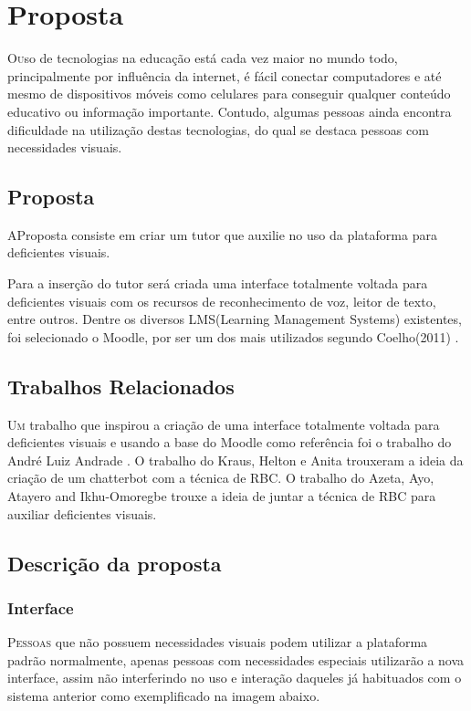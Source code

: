 \chapter{Proposta} \label{chap:Proposta}
\lettrine{O} uso de tecnologias na educação está cada vez maior no mundo todo, principalmente por influência da internet, é fácil conectar computadores e até mesmo de dispositivos móveis como celulares para conseguir qualquer conteúdo educativo ou informação importante. Contudo, algumas pessoas ainda encontra dificuldade na utilização destas tecnologias, do qual se destaca pessoas com necessidades visuais.

\section{Proposta}
\lettrine{A} Proposta consiste em criar um tutor que auxilie no uso da plataforma para deficientes visuais.

Para a inserção do tutor será criada uma interface totalmente voltada para deficientes visuais com os recursos de reconhecimento de voz, leitor de texto, entre outros. Dentre os diversos LMS(Learning Management Systems) existentes, foi selecionado o Moodle, por ser um dos mais utilizados segundo Coelho(2011) \citep{coelho2011acessibilidade}.


\section{Trabalhos Relacionados}
\lettrine{U}{m} trabalho que inspirou a criação de uma interface totalmente voltada para deficientes visuais e usando a base do Moodle como referência foi o trabalho do André Luiz Andrade \citep{rezende2005abaco}. O trabalho do Kraus, Helton e Anita \citep{kraus2007desenvolvimento} trouxeram a ideia da criação de um chatterbot com a técnica de RBC. O trabalho do Azeta, Ayo, Atayero and Ikhu-Omoregbe \citep{azeta2009case} trouxe a ideia de juntar a técnica de RBC para auxiliar deficientes visuais.

\section{Descrição da proposta}
\subsection{Interface}
\lettrine{P}{essoas} que não possuem necessidades visuais podem utilizar a plataforma padrão normalmente, apenas pessoas com necessidades especiais utilizarão a nova interface, assim não interferindo no uso e interação daqueles já habituados com o sistema anterior como exemplificado na imagem abaixo.

